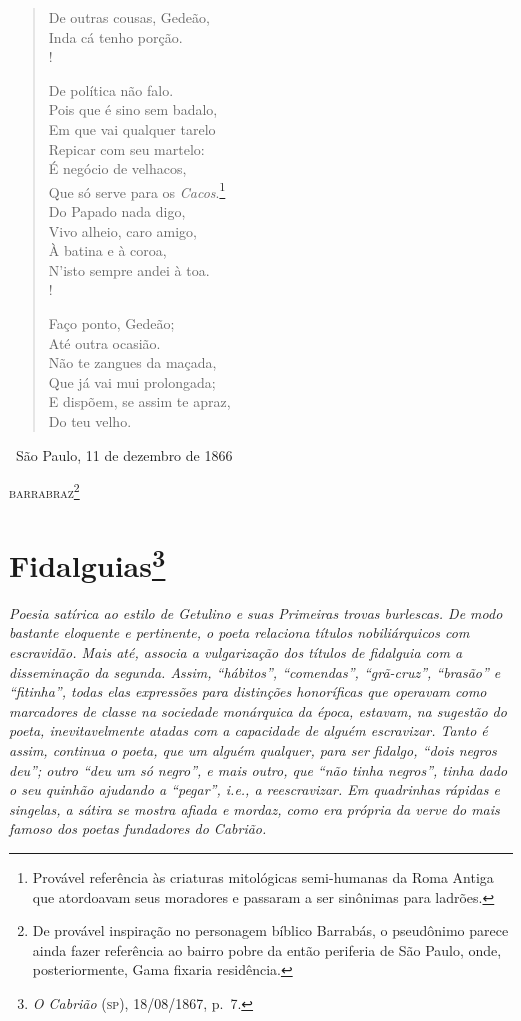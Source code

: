 \begin{verse}
De outras cousas, Gedeão,\\
Inda cá tenho porção.\\!

De política não falo.\\
Pois que é sino sem badalo,\\
Em que vai qualquer tarelo\\
Repicar com seu martelo:\\
É negócio de velhacos,\\
Que só serve para os \emph{Cacos}.\footnote{ Provável referência às
                                criaturas mitológicas semi-humanas da Roma Antiga que atordoavam seus
                                moradores e passaram a ser sinônimas para ladrões.}\\
Do Papado nada digo,\\
Vivo alheio, caro amigo,\\
À batina e à coroa,\\
N'isto sempre andei à toa.\\!

Faço ponto, Gedeão;\\
Até outra ocasião.\\
Não te zangues da maçada,\\
Que já vai mui prolongada;\\
E dispõem, se assim te apraz,\\
Do teu velho.
\end{verse}\medskip

\hfill\ São Paulo, 11 de dezembro de 1866

\hfill\textsc{barrabraz}\footnote{ De provável inspiração no personagem bíblico
  Barrabás, o pseudônimo parece ainda fazer referência ao bairro pobre
  da então periferia de São Paulo, onde, posteriormente, Gama
  fixaria residência.}

\chapter{Fidalguias\footnote{\emph{O
  Cabrião} (\textsc{sp}), 18/08/1867, p.~7.}}

\begin{didascalia}\itshape
Poesia satírica ao estilo de Getulino e suas \textnormal{Primeiras trovas
burlescas}. De modo bastante eloquente e pertinente, o poeta relaciona
títulos nobiliárquicos com escravidão. Mais até, associa a vulgarização
dos títulos de fidalguia com a disseminação da segunda. Assim,
``hábitos'', ``comendas'', ``grã-cruz'', ``brasão'' e ``fitinha'', todas elas
expressões para distinções honoríficas que operavam como marcadores de
classe na sociedade monárquica da época, estavam, na sugestão do poeta,
inevitavelmente atadas com a capacidade de alguém escravizar. Tanto é
assim, continua o poeta, que um alguém qualquer, para ser fidalgo, ``dois
negros deu''; outro ``deu um só negro'', e mais outro, que ``não tinha
negros'', tinha dado o seu quinhão ajudando a ``pegar'', i.e., a
reescravizar. Em quadrinhas rápidas e singelas, a sátira se mostra
afiada e mordaz, como era própria da verve do mais famoso dos poetas
fundadores do \textnormal{Cabrião}.
\end{didascalia}



